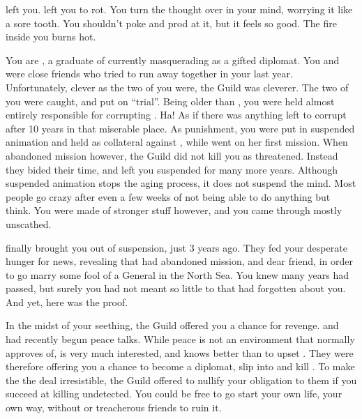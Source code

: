 \documentclass[char]{NeptuneBall}
\begin{document}
\name{\cDiplomat{}}


\cQueen{\They} left you. \cQueen{\They} left you to rot. You turn the thought over in your mind, worrying it like a sore tooth. You shouldn't poke and prod at it, but it feels so good. The fire inside you burns hot.

You are \cDiplomat{}, a graduate of \pAssassin{} currently masquerading as a gifted diplomat. You and \cQueen{} were close friends who tried to run away together in your last year. Unfortunately, clever as the two of you were, the Guild was cleverer. The two of you were caught, and put on ``trial''. Being older than \cQueen{}, you were held almost entirely responsible for corrupting \cQueen{\them}. Ha! As if there was anything left to corrupt after 10 years in that miserable place. As punishment, you were put in suspended animation and held as collateral against \cQueen{}, while \cQueen{\they} went on her first mission. When \cQueen{} abandoned \cQueen{\them} mission however, the Guild did not kill you as threatened. Instead they bided their time, and left you suspended for many more years. Although suspended animation stops the aging process, it does not suspend the mind. Most people go crazy after even a few weeks of not being able to do anything but think. You were made of stronger stuff however, and you came through mostly unscathed.

\pAssassin{} finally brought you out of suspension, just 3 years ago. They fed your desperate hunger for news, revealing that \cQueen{} had abandoned \cQueen{\them} mission, and \cQueen{\them} dear friend, in order to go marry some fool of a General in the North Sea. You knew many years had passed, but surely you had not meant so little to \cQueen{} that \cQueen{\they} had forgotten about you. And yet, here was the proof.  

In the midst of your seething, the Guild offered you a chance for revenge.  \pAtlantis{} and \pPacifica{} had recently begun peace talks. While peace is not an environment that \pAssassin{} normally approves of, \cPacificanRuler{\King} \cPacificanRuler{} is very much interested, and \pAssassin{} knows better than to upset \cPacificanRuler{\them}. They were therefore offering you a chance to become a diplomat, slip into \pAtlantis{} and kill \cQueen{}. To make the the deal irresistible, the Guild offered to nullify your obligation to them if you succeed at killing \cQueen{\them} undetected. You could be free to go start your own life, your own way, without \pAssassin{} or treacherous friends to ruin it.
\end{document}
